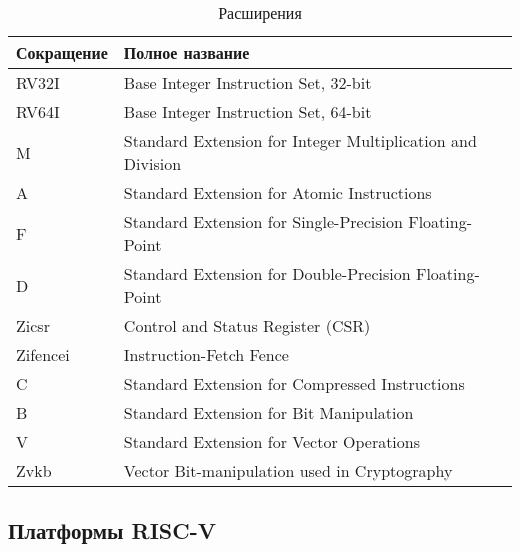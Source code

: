 \begin{table}[h]
    \begin{english}
        \begin{center}
            \begin{tabularx}{\linewidth}{lX}
                \toprule
                Сокращение & Полное название                                            \\ \midrule
                RV32I      & Base Integer Instruction Set, 32-bit                       \\ \midrule
                RV64I      & Base Integer Instruction Set, 64-bit                       \\ \midrule
                M          & Standard Extension for Integer Multiplication and Division \\ \midrule
                A          & Standard Extension for Atomic Instructions                 \\ \midrule
                F          & Standard Extension for Single-Precision Floating-Point     \\ \midrule
                D          & Standard Extension for Double-Precision Floating-Point     \\ \midrule
                Zicsr      & Control and Status Register (CSR)                          \\ \midrule
                Zifencei   & Instruction-Fetch Fence                                    \\ \midrule
                C          & Standard Extension for Compressed Instructions             \\ \midrule
                B          & Standard Extension for Bit Manipulation                    \\ \midrule
                V          & Standard Extension for Vector Operations                   \\ \midrule
                Zvkb       & Vector Bit-manipulation used in Cryptography               \\
                \bottomrule
            \end{tabularx}
        \end{center}
    \end{english}
    \caption{Расширения \riscv}
    \label{tab:extensions}
\end{table}

\subsection{Платформы RISC-V}

